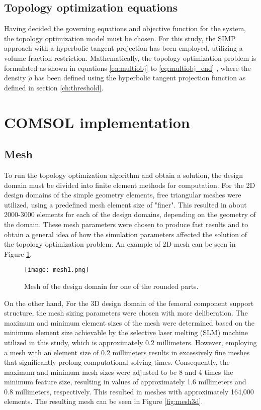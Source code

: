 \documentclass[../main.tex]{subfiles}
\begin{document}
\subsection{Topology optimization equations}

Having decided the governing equations and objective function for the system, the topology optimization model must be chosen. For this study, the SIMP approach with a hyperbolic tangent projection has been employed, utilizing a volume fraction restriction. Mathematically, the topology optimization problem is formulated as shown in equations \ref{eq:multiobj} to \ref{eq:multiobj_end} , where the density $\tilde{\rho}$ has been defined using the hyperbolic tangent projection function as defined in section \ref{ch:threshold}. 

\section{COMSOL implementation}

\subsection{Mesh}

To run the topology optimization algorithm and obtain a solution, the design domain must be divided into finite element methods for computation. For the 2D design domains of the simple geometry elements, free triangular meshes were utilized, using a predefined mesh element size of "finer". This resulted in about 2000-3000 elements for each of the design domains, depending on the geometry of the domain. These mesh parameters were chosen to produce fast results and to obtain a general idea of how the simulation parameters affected the solution of the topology optimization problem. An example of 2D mesh can be seen in Figure \ref{fig:mesh2d}.

\begin{figure}[h!]
  \texttt{[image: mesh1.png]}
  \caption{Mesh of the design domain for one of the rounded parts.}
  \label{fig:mesh2d}
\end{figure}

On the other hand, For the 3D design domain of the femoral component support structure, the mesh sizing parameters were chosen with more deliberation. The maximum and minimum element sizes of the mesh were determined based on the minimum element size achievable by the selective laser melting (SLM) machine utilized in this study, which is approximately 0.2 millimeters. However, employing a mesh with an element size of 0.2 millimeters results in excessively fine meshes that significantly prolong computational solving times. Consequently, the maximum and minimum mesh sizes were adjusted to be 8 and 4 times the minimum feature size, resulting in values of approximately 1.6 millimeters and 0.8 millimeters, respectively. This resulted in meshes with approximately 164,000 elements. The resulting mesh can be seen in Figure \ref{fig:mesh3d}.
\end{document}
